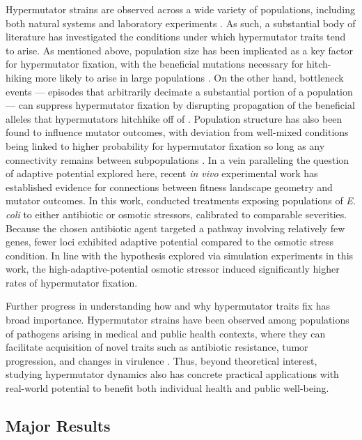 Hypermutator strains are observed across a wide variety of populations, including both natural systems and laboratory experiments \citep{sniegowski1997evolution,swings2017adaptive,maddamsetti2020divergent,cherry2018methylation}.
As such, a substantial body of literature has investigated the conditions under which hypermutator traits tend to arise.
As mentioned above, population size has been implicated as a key factor for hypermutator fixation, with the beneficial mutations necessary for hitch-hiking more likely to arise in large populations \citep{raynes2018sign}.
On the other hand, bottleneck events --- episodes that arbitrarily decimate a substantial portion of a population --- can suppress hypermutator fixation by disrupting propagation of the beneficial alleles that hypermutators hitchhike off of \citep{raynes2013effect}.
Population structure has also been found to influence mutator outcomes, with deviation from well-mixed conditions being linked to higher probability for hypermutator fixation so long as any connectivity remains between subpopulations \citep{raynes2019migration}.
In a vein paralleling the question of adaptive potential explored here, recent \textit{in vivo} experimental work has established evidence for connections between fitness landscape geometry and mutator outcomes.
In this work, \citet{callens2023hypermutator} conducted treatments exposing populations of \textit{E. coli} to either antibiotic or osmotic stressors, calibrated to comparable severities.
Because the chosen antibiotic agent targeted a pathway involving relatively few genes, fewer loci exhibited adaptive potential compared to the osmotic stress condition.
In line with the hypothesis explored via simulation experiments in this work, the high-adaptive-potential osmotic stressor induced significantly higher rates of hypermutator fixation.

Further progress in understanding how and why hypermutator traits fix has broad importance.
Hypermutator strains have been observed among populations of pathogens arising in medical and public health contexts, where they can facilitate acquisition of novel traits such as antibiotic resistance, tumor progression, and changes in virulence \citep{eliopoulos2003hypermutation,jolivetgougeon2011bacterial,stern2016viral,schlesner2015hypermutation}.
Thus, beyond theoretical interest, studying hypermutator dynamics also has concrete practical applications with real-world potential to benefit both individual health and public well-being.

\subsection{Major Results}

